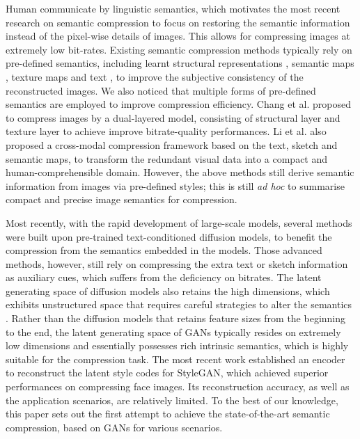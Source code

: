 {Human communicate by linguistic semantics, which motivates the most recent research on semantic compression to focus on restoring the semantic information instead of the pixel-wise details of images. This allows for compressing images at extremely low bit-rates. Existing semantic compression methods typically rely on pre-defined semantics, including learnt structural representations \cite{zhang2024machine}, semantic maps \cite{huang2021deep, korber2024egic, akbari2019dsslic}, texture maps \cite{chang2023semantic} and text \cite{lee2024neural}, to improve the subjective consistency of the reconstructed images. We also noticed that multiple forms of pre-defined semantics are employed to improve compression efficiency. Chang et al. \cite{chang2022conceptual} proposed to compress images by a dual-layered model, consisting of structural layer and texture layer to achieve improve bitrate-quality performances.  Li et al. \cite{li2021cross} also proposed a  cross-modal compression framework based on the text, sketch and semantic maps, to transform the redundant visual data into a compact and human-comprehensible domain. However, the above methods still derive semantic information  from images via pre-defined styles; this is still \textit{ad hoc} to summarise compact and precise image semantics for compression. }

{Most recently, with the rapid development of large-scale models, several methods \cite{lei2023text+sketch, careil2023towards, li2024misc} were built upon pre-trained text-conditioned diffusion models, to benefit the compression from the semantics embedded in the models. Those advanced methods, however, still rely on compressing the extra text or sketch information as auxiliary cues, which suffers from the deficiency on bitrates. The latent generating space of diffusion models also retains the high dimensions, which exhibits unstructured space that requires careful strategies to alter the semantics \cite{wu2023latent, guo2024smooth}. Rather than the diffusion models that retains feature sizes from the beginning to the end, the latent generating space of GANs typically resides on extremely low dimensions and essentially possesses rich intrinsic semantics, which is highly suitable for the compression task. The most recent work \cite{mao2023scalable} established an encoder to reconstruct the latent style codes for StyleGAN, which achieved superior performances on compressing face images. Its reconstruction accuracy, as well as the application scenarios, are relatively limited. To the best of our knowledge, this paper sets out the first attempt to achieve the state-of-the-art semantic compression, based on GANs for various scenarios.} 

\vspace{-1em}